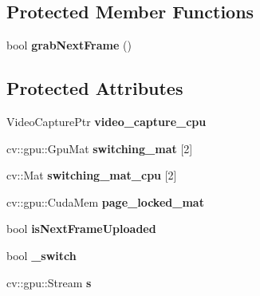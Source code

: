 \subsection*{Protected Member Functions}
\begin{DoxyCompactItemize}
\item 
\hypertarget{classskl_1_1gpu_1_1_video_capture_gpu_a50cbbd354550f63438d22fa1dc86af7d}{}\label{classskl_1_1gpu_1_1_video_capture_gpu_a50cbbd354550f63438d22fa1dc86af7d} 
bool {\bfseries grab\+Next\+Frame} ()
\end{DoxyCompactItemize}
\subsection*{Protected Attributes}
\begin{DoxyCompactItemize}
\item 
\hypertarget{classskl_1_1gpu_1_1_video_capture_gpu_a3689db663d8ed2886cd22210db000d5a}{}\label{classskl_1_1gpu_1_1_video_capture_gpu_a3689db663d8ed2886cd22210db000d5a} 
Video\+Capture\+Ptr {\bfseries video\+\_\+capture\+\_\+cpu}
\item 
\hypertarget{classskl_1_1gpu_1_1_video_capture_gpu_a234b5a7fa869951933de361c426ae438}{}\label{classskl_1_1gpu_1_1_video_capture_gpu_a234b5a7fa869951933de361c426ae438} 
cv\+::gpu\+::\+Gpu\+Mat {\bfseries switching\+\_\+mat} \mbox{[}2\mbox{]}
\item 
\hypertarget{classskl_1_1gpu_1_1_video_capture_gpu_ade760bce99317a45336bf38416809af9}{}\label{classskl_1_1gpu_1_1_video_capture_gpu_ade760bce99317a45336bf38416809af9} 
cv\+::\+Mat {\bfseries switching\+\_\+mat\+\_\+cpu} \mbox{[}2\mbox{]}
\item 
\hypertarget{classskl_1_1gpu_1_1_video_capture_gpu_a921a7b3548d6a929ea7418d07324bb3b}{}\label{classskl_1_1gpu_1_1_video_capture_gpu_a921a7b3548d6a929ea7418d07324bb3b} 
cv\+::gpu\+::\+Cuda\+Mem {\bfseries page\+\_\+locked\+\_\+mat}
\item 
\hypertarget{classskl_1_1gpu_1_1_video_capture_gpu_aa97f7007544dc01212513c25c568fd68}{}\label{classskl_1_1gpu_1_1_video_capture_gpu_aa97f7007544dc01212513c25c568fd68} 
bool {\bfseries is\+Next\+Frame\+Uploaded}
\item 
\hypertarget{classskl_1_1gpu_1_1_video_capture_gpu_a9a117855378ddbd618350fa66fbceda3}{}\label{classskl_1_1gpu_1_1_video_capture_gpu_a9a117855378ddbd618350fa66fbceda3} 
bool {\bfseries \+\_\+switch}
\item 
\hypertarget{classskl_1_1gpu_1_1_video_capture_gpu_a56938aaf74d58a897333660efd6aaff1}{}\label{classskl_1_1gpu_1_1_video_capture_gpu_a56938aaf74d58a897333660efd6aaff1} 
cv\+::gpu\+::\+Stream {\bfseries s}
\end{DoxyCompactItemize}


